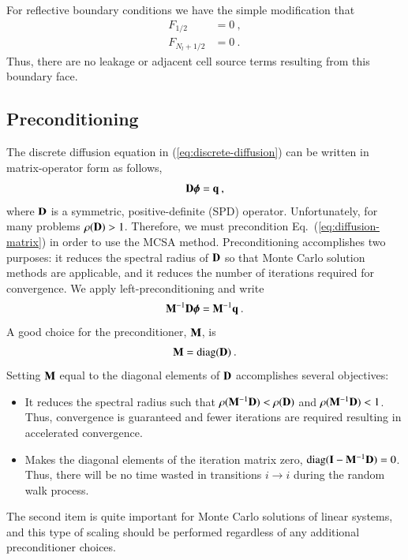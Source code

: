 \documentclass[preprint,12pt]{elsarticle}
\newcommand{\vI}{\ensuremath{\ve{I}}}
\newcommand{\bphi}{\ensuremath{\boldsymbol{\phi}}}
\DeclareMathOperator{\diag}{diag}
\begin{document}
For reflective boundary conditions we have the simple modification
that
\begin{align}
  F_{1/2} &= 0\:, \\
  F_{N_l+1/2} &= 0\:.
\end{align}
Thus, there are no leakage or adjacent cell source terms resulting
from this boundary face.

\subsection{Preconditioning}
\label{sec:preconditioning}

The discrete diffusion equation in (\ref{eq:discrete-diffusion}) can
be written in matrix-operator form as follows,
\begin{equation}
  \ve{D}\bphi = \ve{q}\:,
  \label{eq:diffusion-matrix}
\end{equation}
where $\mathbf{D}$ is a symmetric, positive-definite (SPD) operator.
Unfortunately, for many problems $\rho(\mathbf{D}) > 1$.  Therefore, we
must precondition Eq.~(\ref{eq:diffusion-matrix}) in order to use the
MCSA method.  Preconditioning accomplishes two purposes: it reduces
the spectral radius of $\mathbf{D}$ so that Monte Carlo solution methods
are applicable, and it reduces the number of iterations required for
convergence.  We apply left-preconditioning and write
\begin{equation}
  \ve{M}^{-1}\ve{D}\bphi = \ve{M}^{-1}\ve{q}\:.
  \label{eq:preconditioned-diffusion}
\end{equation}
A good choice for the preconditioner, $\mathbf{M}$, is
\begin{equation}
  \ve{M}=\diag(\ve{D})\:.
  \label{eq:preconditioner}
\end{equation}
Setting $\mathbf{M}$ equal to the diagonal elements of $\mathbf{D}$
accomplishes several objectives:
\begin{itemize}
\item It reduces the spectral radius such that
  $\rho(\mathbf{M}^{-1}\mathbf{D}) < \rho(\mathbf{D})$ and
  $\rho(\mathbf{M}^{-1}\mathbf{D}) < 1$.  Thus, convergence is guaranteed and
  fewer iterations are required resulting in accelerated convergence.
\item Makes the diagonal elements of the iteration matrix zero,
  $\diag(\vI - \ve{M}^{-1}\ve{D}) = 0$.  Thus, there will be no time
  wasted in transitions $i\rightarrow i$ during the random walk
  process.
\end{itemize}
The second item is quite important for Monte Carlo solutions of linear
systems, and this type of scaling should be performed regardless of
any additional preconditioner choices.  
\end{document}
